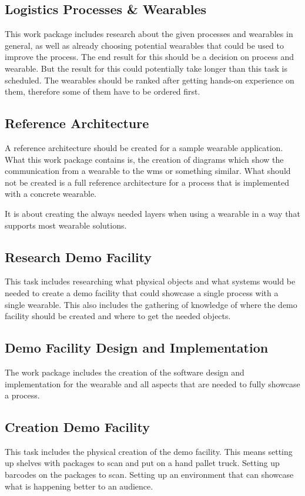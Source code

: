 \subsection{Logistics Processes \& Wearables}
This work package includes research about the given processes and wearables in general, as well as already choosing potential wearables that could be used to improve the process. The end result for this should be a decision on process and wearable. But the result for this could potentially take longer than this task is scheduled. The wearables should be ranked after getting hands-on experience on them, therefore some of them have to be ordered first.

\subsection{Reference Architecture}
A reference architecture should be created for a sample wearable application. What this work package contains is, the creation of diagrams which show the communication from a wearable to the \gls{wms} or something similar. What should not be created is a full reference architecture for a process that is implemented with a concrete wearable. 

It is about creating the always needed layers when using a wearable in a way that supports most wearable solutions.

\subsection{Research Demo Facility}
This task includes researching what physical objects and what systems would be needed to create a demo facility that could showcase a single process with a single wearable. This also includes the gathering of knowledge of where the demo facility should be created and where to get the needed objects.

\subsection{Demo Facility Design and Implementation}
The work package includes the creation of the software design and implementation for the wearable and all aspects that are needed to fully showcase a process.

\subsection{Creation Demo Facility}
This task includes the physical creation of the demo facility. This means setting up shelves with packages to scan and put on a hand pallet truck. Setting up barcodes on the packages to scan. Setting up an environment that can showcase what is happening better to an audience.
